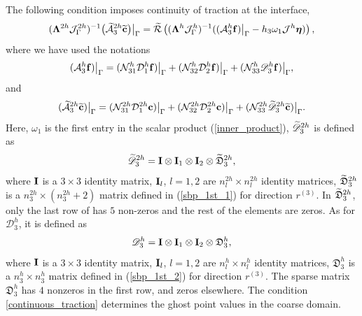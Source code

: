 The following condition imposes continuity of traction at the interface,
\begin{equation}\label{continuous_traction}
(\bm{\Lambda}^{2h}{\mathcal J}_{\Gamma}^{2h})^{-1}\big(\wt{\mathcal{A}}_3^{2h}\wt{\bf c}\big)\big|_\Gamma
= \wt{\mathcal{R}}\left((\bm{\Lambda}^{h}{\mathcal J}^h_{\Gamma})^{-1}((\mathcal{A}_3^h{\bf f})\big|_\Gamma-h_3\omega_1{\mathcal J}^h{\bm \eta})\right),
\end{equation}
where we have used the notations
\begin{equation}\label{hatAf}
(\mathcal{A}_3^h{\bf f})\big|_\Gamma = (\mathcal{N}_{31}^{h}\mathcal{D}^h_1{\bf f})\big|_\Gamma + (\mathcal{N}_{32}^h\mathcal{D}^h_2{\bf f})\big|_\Gamma + (\mathcal{N}_{33}^h\mathscr{D}_3^h{\bf f})\big|_\Gamma,
\end{equation}
and
\begin{equation}\label{hatAc}
(\wt{\mathcal{A}}_3^{2h}\wt{\bf c})\big|_\Gamma = (\mathcal{N}_{31}^{2h}\mathcal{D}^{2h}_1{\bf c})\big|_\Gamma + (\mathcal{N}_{32}^{2h}\mathcal{D}^{2h}_2{\bf c})\big|_\Gamma + (\mathcal{N}_{33}^{2h}\wt{\mathscr D}^{2h}_3\wt{\bf c})\big|_\Gamma.
\end{equation}
Here, $\omega_1$ is the first entry in the scalar product (\ref{inner_product}), $\widetilde{\mathscr{D}}_3^{2h}$ is defined as
\[\widetilde{\mathscr{D}}_3^{2h} = {\bf I}\otimes {\bf I}_1 \otimes {\bf I}_2 \otimes \widetilde{\mathfrak{D}}_3^{2h},\]
where ${\bf I}$ is a $3\times3$ identity matrix, ${\bf I}_l$, $l = 1,2$ are $n_l^{2h}\times n_l^{2h}$ identity matrices, $\widetilde{\mathfrak{D}}_3^{2h}$ is a $n_3^{2h}\times (n_3^{2h}+2)$ matrix defined in (\ref{sbp_1st_1}) for direction $r^{(3)}$. In $\widetilde{\mathfrak{D}}_3^{2h}$, only the last row of  has $5$ non-zeros and the rest of the elements are zeros. As for $\mathscr{D}_3^{h}$, it is defined as
\[\mathscr{D}_3^{h} = {\bf I}\otimes {\bf I}_1 \otimes {\bf I}_2 \otimes {\mathfrak{D}}_3^{h},\]
where ${\bf I}$ is a $3\times3$ identity matrix, ${\bf I}_l$, $l = 1,2$ are $n_l^{h}\times n_l^{h}$ identity matrices, $\mathfrak{D}_3^{h}$ is a $n_3^{h}\times n_3^{h}$ matrix defined in (\ref{sbp_1st_2}) for direction $r^{(3)}$. The sparse matrix $\mathfrak{D}_3^{h}$ has $4$ nonzeros in the first row, and zeros elsewhere. The condition \eqref{continuous_traction} determines the ghost point values in the coarse domain. 

